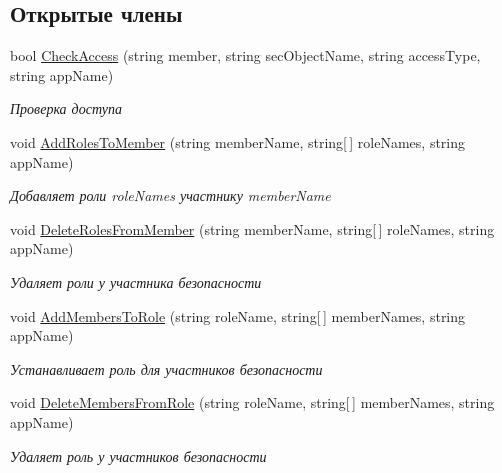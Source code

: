 \subsection*{Открытые члены}
\begin{DoxyCompactItemize}
\item 
bool \hyperlink{interface_security_1_1_interfaces_1_1_i_security_tools_a744adcef9183e1a92ddbc475d05f23ce}{Check\+Access} (string member, string sec\+Object\+Name, string access\+Type, string app\+Name)
\begin{DoxyCompactList}\small\item\em Проверка доступа \end{DoxyCompactList}\item 
void \hyperlink{interface_security_1_1_interfaces_1_1_i_security_tools_ae401d07ed80380d95638be5f61b23716}{Add\+Roles\+To\+Member} (string member\+Name, string\mbox{[}$\,$\mbox{]} role\+Names, string app\+Name)
\begin{DoxyCompactList}\small\item\em Добавляет роли role\+Names участнику member\+Name \end{DoxyCompactList}\item 
void \hyperlink{interface_security_1_1_interfaces_1_1_i_security_tools_a0e167725f3e0ca5f4e8c23a742c8e8f4}{Delete\+Roles\+From\+Member} (string member\+Name, string\mbox{[}$\,$\mbox{]} role\+Names, string app\+Name)
\begin{DoxyCompactList}\small\item\em Удаляет роли у участника безопасности \end{DoxyCompactList}\item 
void \hyperlink{interface_security_1_1_interfaces_1_1_i_security_tools_a4d0a0d91c4f3d93c87ac678d4dd4e859}{Add\+Members\+To\+Role} (string role\+Name, string\mbox{[}$\,$\mbox{]} member\+Names, string app\+Name)
\begin{DoxyCompactList}\small\item\em Устанавливает роль для участников безопасности \end{DoxyCompactList}\item 
void \hyperlink{interface_security_1_1_interfaces_1_1_i_security_tools_acc5d44efa581c891fed28548fc95a4dc}{Delete\+Members\+From\+Role} (string role\+Name, string\mbox{[}$\,$\mbox{]} member\+Names, string app\+Name)
\begin{DoxyCompactList}\small\item\em Удаляет роль у участников безопасности \end{DoxyCompactList}\item 

\end{DoxyCompactItemize}
